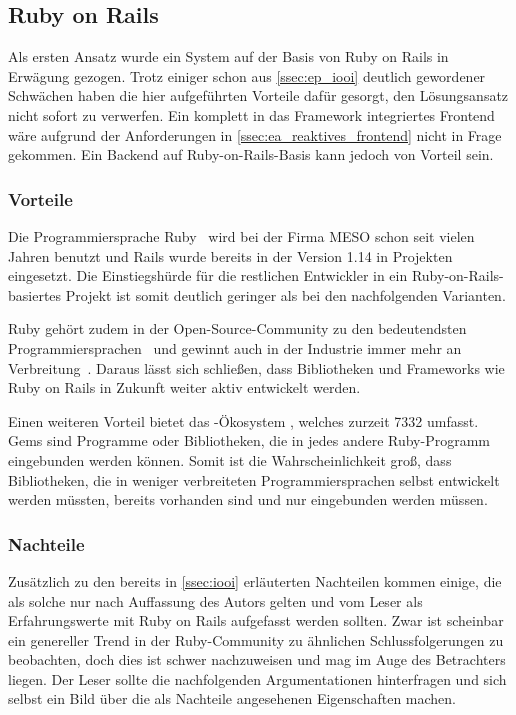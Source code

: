 \subsection{Ruby on Rails}
\label{ssec:kl_ruby_on_rails}

Als ersten Ansatz wurde ein System auf der Basis von Ruby on Rails in Erwägung
gezogen.  Trotz einiger schon aus
\cref{ssec:ep_iooi} deutlich gewordener
Schwächen haben die hier aufgeführten Vorteile dafür gesorgt, den Lösungsansatz
nicht sofort zu verwerfen.  Ein komplett in das Framework integriertes Frontend
wäre aufgrund der Anforderungen in \cref{ssec:ea_reaktives_frontend} nicht in
Frage gekommen.  Ein Backend auf Ruby-on-Rails-Basis kann jedoch von Vorteil
sein.

\subsubsection{Vorteile}
\label{sssec:elr_vorteile}

Die Programmiersprache Ruby~\cite{ruby} wird bei der Firma MESO schon seit vielen
Jahren benutzt und Rails wurde bereits in der Version 1.14 in Projekten
eingesetzt.  Die Einstiegshürde für die restlichen Entwickler in ein
Ruby-on-Rails-basiertes Projekt ist somit deutlich geringer als bei den
nachfolgenden Varianten.

Ruby gehört zudem in der Open-Source-Community zu den bedeutendsten
Programmiersprachen~\cite{ghlangtrends} und gewinnt auch in der Industrie immer
mehr an Verbreitung~\cite{tiobe}.  Daraus lässt sich schließen, dass
Bibliotheken und Frameworks wie Ruby on Rails in Zukunft weiter aktiv entwickelt
werden.

Einen weiteren Vorteil bietet das -Ökosystem
\cite{rubygems}, welches zurzeit 7332  umfasst.  Gems sind
Programme oder Bibliotheken, die in jedes andere Ruby-Programm eingebunden
werden können.  Somit ist die Wahrscheinlichkeit groß, dass Bibliotheken, die
in weniger verbreiteten Programmiersprachen selbst entwickelt werden müssten,
bereits vorhanden sind und nur eingebunden werden müssen.

\subsubsection{Nachteile}
\label{sssec:elr_nachteile}

Zusätzlich zu den bereits in \cref{ssec:iooi} erläuterten Nachteilen kommen
einige, die als solche nur nach Auffassung des Autors gelten und vom Leser als
Erfahrungswerte mit Ruby on Rails aufgefasst werden sollten.  Zwar ist
scheinbar ein genereller Trend in der Ruby-Community zu ähnlichen
Schlussfolgerungen zu beobachten, doch dies ist schwer nachzuweisen und mag im
Auge des Betrachters liegen.  Der Leser sollte die nachfolgenden
Argumentationen hinterfragen und sich selbst ein Bild über die als Nachteile
angesehenen Eigenschaften machen.

